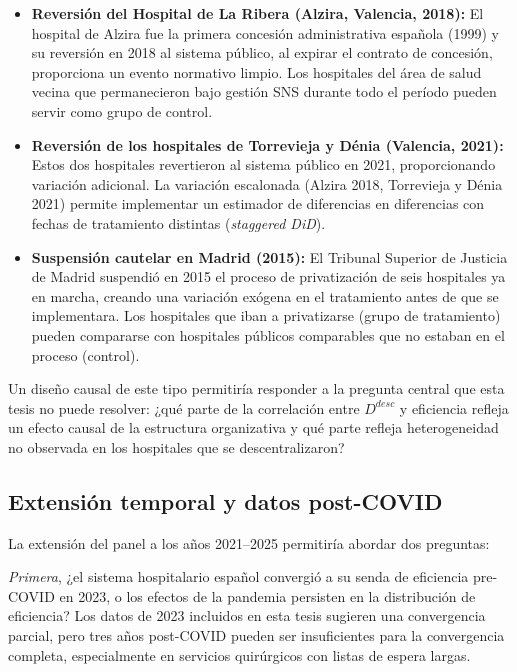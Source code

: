 \begin{itemize}
  \item \textbf{Reversión del Hospital de La Ribera (Alzira, Valencia, 2018):} El hospital de Alzira fue la primera concesión administrativa española (1999) y su reversión en 2018 al sistema público, al expirar el contrato de concesión, proporciona un evento normativo limpio. Los hospitales del área de salud vecina que permanecieron bajo gestión SNS durante todo el período pueden servir como grupo de control.
  \item \textbf{Reversión de los hospitales de Torrevieja y Dénia (Valencia, 2021):} Estos dos hospitales revertieron al sistema público en 2021, proporcionando variación adicional. La variación escalonada (Alzira 2018, Torrevieja y Dénia 2021) permite implementar un estimador de diferencias en diferencias con fechas de tratamiento distintas (\textit{staggered DiD}).
  \item \textbf{Suspensión cautelar en Madrid (2015):} El Tribunal Superior de Justicia de Madrid suspendió en 2015 el proceso de privatización de seis hospitales ya en marcha, creando una variación exógena en el tratamiento antes de que se implementara. Los hospitales que iban a privatizarse (grupo de tratamiento) pueden compararse con hospitales públicos comparables que no estaban en el proceso (control).
\end{itemize}

Un diseño causal de este tipo permitiría responder a la pregunta central que esta tesis no puede resolver: ¿qué parte de la correlación entre $D^{desc}$ y eficiencia refleja un efecto causal de la estructura organizativa y qué parte refleja heterogeneidad no observada en los hospitales que se descentralizaron?

\subsection{Extensión temporal y datos post-COVID}

La extensión del panel a los años 2021--2025 permitiría abordar dos preguntas:

\textit{Primera}, ¿el sistema hospitalario español convergió a su senda de eficiencia pre-COVID en 2023, o los efectos de la pandemia persisten en la distribución de eficiencia? Los datos de 2023 incluidos en esta tesis sugieren una convergencia parcial, pero tres años post-COVID pueden ser insuficientes para la convergencia completa, especialmente en servicios quirúrgicos con listas de espera largas.

